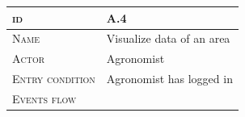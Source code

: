 \begin{table}[H]
    \centering
    \begin{tabular}[c]{|l|p{}|}
        \hline %
    	\textsc{id}                 &   A.4\\
    	\hline %
    	\textsc{Name}               &   Visualize data of an area\\
    	\hline %
    	\textsc{Actor}             &   Agronomist\\
    	\hline %
    	\textsc{Entry condition}   &   Agronomist has logged in\\
    	\hline %
    	\textsc{Events flow}         &   %
            	                        \begin{itemize}


\end{itemize}
\end{tabular}
\end{table}
